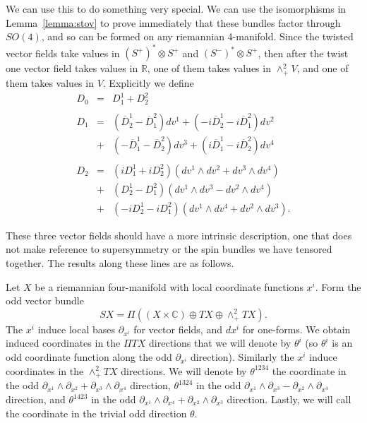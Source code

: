 \documentclass[twoside]{amsart}
\newcommand{\CC}{\ensuremath{\mathbb{C}}}
\newcommand{\RR}{\ensuremath{\mathbb{R}}}
\newcommand{\lemmaref}[1]{Lemma~\ref{lemma:#1}}
\newcommand{\enm}[1]{\ensuremath{#1}}
\renewcommand{\bar}[1]{\overline{#1}}
\newcommand{\sof}{\enm{SO(4)}}
\newcommand{\spl}{\enm{S^{+}}}
\newcommand{\sm}{\enm{S^{-}}}
\newcommand{\spd}{\enm{(\spl)^{*}}}
\newcommand{\smd}{\enm{(\sm)^{*}}}
\newcommand{\wdd}[2]{\enm{\partial_{x^{#1}}\wedge \partial_{x^{#2}}}}
\newcommand{\upperlowerabc}[3]{\enm{{#1}^{#2}_{#3}}}
\newcommand{\upperdotlowerabc}[3]{\upperlowerabc{#1}{#2}{\dot{#3}}}
\newcommand{\dul}[2]{\upperlowerabc{D}{#1}{#2}}
\newcommand{\dudl}[2]{\upperdotlowerabc{\bar{D}}{#1}{#2}}
\begin{document}
We can use this to do something very special.  We can use the
isomorphisms in \lemmaref{stov} to
prove immediately that these bundles factor through \sof, and so can
be formed on any riemannian 4-manifold.  Since the twisted
vector fields take values in \( \spd\otimes\spl \) and \(
\smd\otimes\spl \), then after the twist
one vector field takes values in \(
\RR \), one of them takes values in \( \wedge^{2}_{+} V \), and one of
them takes values in \( V \).  Explicitly we define
\begin{eqnarray}
    D_{0} & = & \dul{1}{1} + \dul{2}{2}\label{eq:d0} \\
    &&\nonumber\\
    D_{1} & = & \left(\dudl{1}{2} - \dudl{2}{1}\right) dv^{1}+
    \left(- i\dudl{1}{2} - i\dudl{2}{1}\right) dv^{2}\label{eq:d1}\\
     & + & \left(-\dudl{1}{1} - \dudl{2}{2} \right) dv^{3}+
     \left(i\dudl{1}{1} - i\dudl{2}{2}\right) dv^{4}\nonumber\\
    &&\nonumber\\
    D_{2} & = & \left(i\dul{1}{1} + i\dul{2}{2}\right)
                (dv^{1}\wedge dv^{2} + dv^{3}\wedge dv^{4})\nonumber\\
    & + & \left(\dul{1}{2} - \dul{2}{1}\right)
                (dv^{1}\wedge dv^{3} - dv^{2}\wedge
dv^{4})\label{eq:d2}\\
    & + & \left(-i\dul{1}{2} - i\dul{2}{1}\right)
                (dv^{1}\wedge dv^{4} + dv^{2}\wedge dv^{3})\nonumber.
\end{eqnarray}

These three vector fields should have a more intrinsic description,
one that does
not make reference to supersymmetry or the spin bundles we have
tensored together.  The results along these lines are as follows.

Let \( X \) be a riemannian four-manifold with local coordinate
functions \( x^{i} \).  Form the odd vector bundle
\[ SX = \Pi\left(
(X\times\CC)\oplus TX\oplus \wedge^{2}_{+}TX\right).  \]
The \( x^{i} \) induce local bases \( \partial_{x^{i}} \) for vector
fields, and \( dx^{i} \) for one-forms.  We obtain induced coordinates
in the \( \Pi TX \) directions that we will denote by \( \theta^{i} \)
(so \( \theta^{i} \) is an odd coordinate function along the odd \(
\partial_{x^{i}} \) direction).  Similarly the \( x^{i} \) induce
coordinates in the \( \wedge^{2}_{+}TX \) directions.  We will denote
by \( \theta^{1234} \) the coordinate in the odd \( \wdd{1}{2} +
\wdd{3}{4} \) direction, \( \theta^{1324} \) in the odd \( \wdd{1}{3}
-
\wdd{2}{4}\) direction, and \( \theta^{1423} \) in the odd \(
\wdd{1}{4} +
\wdd{2}{3} \) direction.  Lastly, we will call the coordinate in the
trivial odd direction \( \theta \).
\end{document}
